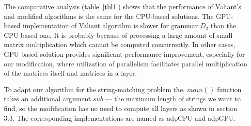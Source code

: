\begin{table*}[h]
\caption{Comparison of the Valiant's algorithm and the modification}
\label{tbl1}
\centering
{}
\end{table*}

The comparative analysis (table~\ref{tbl1}) shows that the performance of Valiant's and modified algorithms is the same for the CPU-based solutions.
The GPU-based implementation of Valiant algorithm is slower for grammar $D_2$ than the CPU-based one. 
It is probably because of processing a large amount of small matrix multiplication which cannot be computed concurrently. 
In other cases, GPU-based solution provides significant performance improvement, especially for our modification, where utilization of parallelism facilitates parallel multiplication of the matrices itself and matrices in a layer.

To adapt our algorithm for the string-matching problem the, $main()$ function takes an additional argument $sub$ --- the maximum length of strings we want to find, so the modification has no need to compute all layers as shown in section 3.3.
The corresponding implementations are named as \textsf{adpCPU} and \textsf{adpGPU}.

